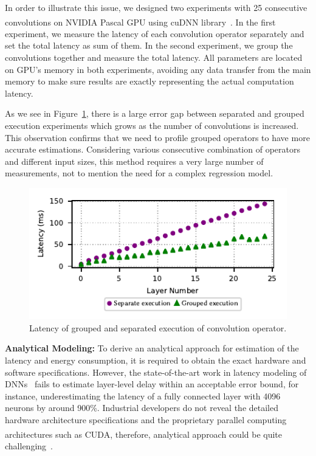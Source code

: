 
In order to illustrate this issue, we designed two experiments with 25 consecutive convolutions on NVIDIA Pascal\textsuperscript{\texttrademark} GPU using cuDNN\textsuperscript{\textregistered} library~\cite{cuDNN}. In the first experiment, we measure the latency of each convolution operator separately and set the total latency as sum of them. In the second experiment, we group the convolutions together and measure the total latency. All parameters are located on GPU's memory in both experiments, avoiding any data transfer from the main memory to make sure results are exactly representing the actual computation latency. 


As we see in Figure~\ref{grouped_execution}, there is a large error gap between separated and grouped execution experiments which grows as the number of convolutions is increased. This observation confirms that we need to profile grouped operators to have more accurate estimations. Considering various consecutive combination of operators and different input sizes, this method requires a very large number of measurements, not to mention the need for a complex regression model.

\begin{figure}
\includegraphics{consec}
\caption{Latency of grouped and separated execution of convolution operator.}\label{grouped_execution}
\end{figure}

\textbf{Analytical Modeling:} To derive an analytical approach for estimation of the latency and energy consumption, it is required to obtain the exact hardware and software specifications. However, the state-of-the-art work in latency modeling of DNNs~\cite{Paleo} fails to estimate layer-level delay within an acceptable error bound, for instance, underestimating the latency of a fully connected layer with 4096 neurons by around 900\%. Industrial developers do not reveal the detailed hardware architecture specifications and the proprietary parallel computing architectures such as CUDA\textsuperscript{\textregistered}, therefore, analytical approach could be quite challenging~\cite{GPUMODEL}.

